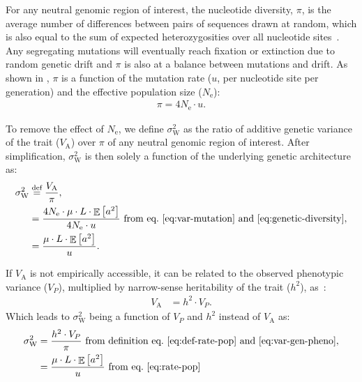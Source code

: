 \documentclass{article}
\newcommand{\defEqual}{\stackrel{\text{def}}{=}}
\newcommand{\Multiply}{\cdot}
\DeclareMathOperator{\E}{\mathbb{E}}
\newcommand{\Ne}{N_{\text{e}}}
\newcommand{\Trait}{P}
\newcommand{\Heritability}{h^2}
\newcommand{\MutationRatePheno}{\mu}
\newcommand{\MutationRateNuc}{u}
\newcommand{\NbrLoci}{L}
\newcommand{\VarPhenotype}{V_{\Trait}}
\newcommand{\VarGenetic}{V_{\mathrm{A}}}
\newcommand{\GenArchi}{\NbrLoci \Multiply \E \left[ a^2 \right]}
\newcommand{\RateWhithin}{\sigma^2_{\mathrm{W}}}
\begin{document}
For any neutral genomic region of interest, the nucleotide diversity, $\pi$, is the average number of differences between pairs of sequences drawn at random, which is also equal to the sum of expected heterozygosities over all nucleotide sites~\citep{tajima_statistical_1989}.
Any segregating mutations will eventually reach fixation or extinction due to random genetic drift and $\pi$ is also at a balance between mutations and drift.
As shown in \citet{tajima_statistical_1989}, $\pi$ is a function of the mutation rate ($\MutationRateNuc$, per nucleotide site per generation) and the effective population size ($\Ne$):
\begin{gather}
    \pi = 4 \Ne \Multiply \MutationRateNuc \label{eq:genetic-diversity}.
\end{gather}

To remove the effect of $\Ne$, we define $\RateWhithin$ as the ratio of additive genetic variance of the trait ($\VarGenetic$) over $\pi$ of any neutral genomic region of interest.
After simplification, $\RateWhithin$ is then solely a function of the underlying genetic architecture as:
\begin{align}
    \RateWhithin & \defEqual \frac{\VarGenetic }{\pi} \label{eq:def-rate-pop}, \\
    & = \frac{4 \Ne \Multiply \MutationRatePheno \Multiply \GenArchi}{4 \Ne \Multiply \MutationRateNuc} \text{ from eq.~\ref{eq:var-mutation} and~\ref{eq:genetic-diversity}}, \\
    & = \frac{\MutationRatePheno \Multiply \GenArchi}{\MutationRateNuc}. \label{eq:rate-pop}
\end{align}

If $\VarGenetic$ is not empirically accessible, it can be related to the observed phenotypic variance ($\VarPhenotype$), multiplied by narrow-sense heritability of the trait ($\Heritability$), as~\citep{hill_data_2008}:
\begin{align}
    \VarGenetic & = \Heritability \Multiply \VarPhenotype.\label{eq:var-gen-pheno}
\end{align}
Which leads to $\RateWhithin$ being a function of $\VarPhenotype$ and $\Heritability$ instead of $\VarGenetic$ as:
\begin{align}
    \RateWhithin & = \frac{\Heritability \Multiply \VarPhenotype }{\pi } \text{ from definition eq.~\ref{eq:def-rate-pop} and~\ref{eq:var-gen-pheno}}, \label{eq:def-rate-pheno-pop} \\
    & = \frac{\MutationRatePheno \Multiply \GenArchi}{\MutationRateNuc} \text{ from eq.~\ref{eq:rate-pop}} \label{eq:rate-pheno-pop}
\end{align}
\end{document}
